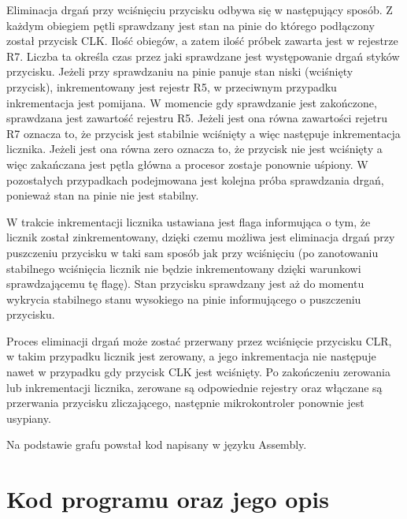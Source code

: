 \documentclass[fleqn]{article}
\begin{document}
Eliminacja drgań przy wciśnięciu przycisku odbywa się w następujący sposób. Z każdym obiegiem pętli sprawdzany jest stan na pinie do którego podłączony został przycisk CLK. Ilość obiegów, a zatem ilość próbek zawarta jest w rejestrze R7. Liczba ta określa czas przez jaki sprawdzane jest występowanie drgań styków przycisku. Jeżeli przy sprawdzaniu na pinie panuje stan niski (wciśnięty przycisk), inkrementowany jest rejestr R5, w przeciwnym przypadku inkrementacja jest pomijana. W momencie gdy sprawdzanie jest zakończone, sprawdzana jest zawartość rejestru R5. Jeżeli jest ona równa zawartości rejetru R7 oznacza to, że przycisk jest stabilnie wciśnięty a więc następuje inkrementacja licznika. Jeżeli jest ona równa zero oznacza to, że przycisk nie jest wciśnięty a więc zakańczana jest pętla główna a procesor zostaje ponownie uśpiony. W pozostałych przypadkach podejmowana jest kolejna próba sprawdzania drgań, ponieważ stan na pinie nie jest stabilny.

W trakcie inkrementacji licznika ustawiana jest flaga informująca o tym, że licznik został zinkrementowany, dzięki czemu możliwa jest eliminacja drgań przy puszczeniu przycisku w taki sam sposób jak przy wciśnięciu (po zanotowaniu stabilnego wciśnięcia licznik nie będzie inkrementowany dzięki warunkowi sprawdzającemu tę flagę). Stan przycisku sprawdzany jest aż do momentu wykrycia stabilnego stanu wysokiego na pinie informującego o puszczeniu przycisku.

Proces eliminacji drgań może zostać przerwany przez wciśnięcie przycisku CLR, w takim przypadku licznik jest zerowany, a jego inkrementacja nie następuje nawet w przypadku gdy przycisk CLK jest wciśnięty. Po zakończeniu zerowania lub inkrementacji licznika, zerowane są odpowiednie rejestry oraz włączane są przerwania przycisku zliczającego, następnie mikrokontroler ponownie jest usypiany.

Na podstawie grafu powstał kod napisany w języku Assembly.



\section{Kod programu oraz jego opis}
\end{document}
